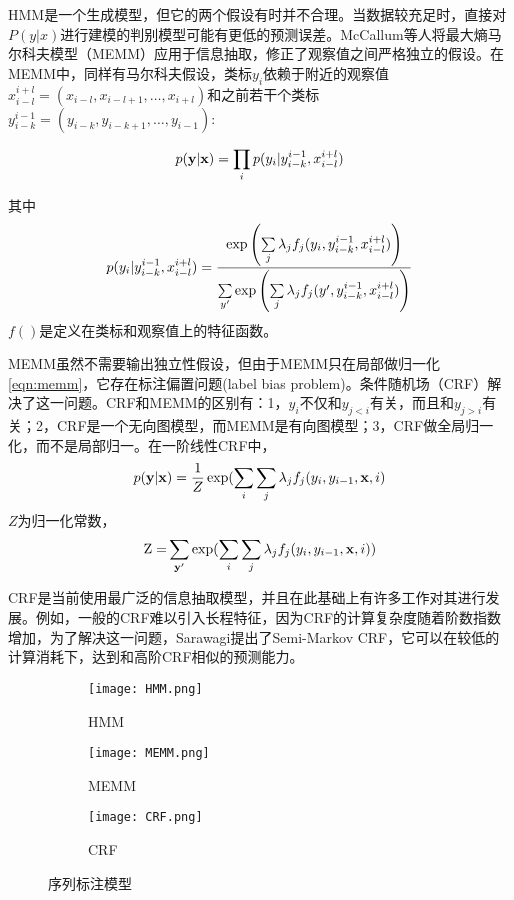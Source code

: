 HMM是一个生成模型，但它的两个假设有时并不合理。当数据较充足时，直接对$P(y|x)$进行建模的判别模型可能有更低的预测误差。McCallum等人将最大熵马尔科夫模型（MEMM）应用于信息抽取\cite{mccallum2000maximum}，修正了观察值之间严格独立的假设。在MEMM中，同样有马尔科夫假设，类标$y_i$依赖于附近的观察值$x_{i - l}^{i + l} = ({x_{i - l}},{x_{i - l + 1}}, \ldots ,{x_{i + l}})$和之前若干个类标$y_{i - k}^{i - 1} = ({y_{i - k}},{y_{i - k + 1}}, \ldots ,{y_{i - 1}})$:

\[p({\bf{y}}|{\bf{x}}) = \prod\limits_i {p({y_i}|y_{i - k}^{i - 1},x_{i - l}^{i + l})} \]

其中
\begin{equation}
{p({y_i}|y_{i - k}^{i - 1},x_{i - l}^{i + l})} = \frac{{\exp \left( {\sum\limits_j {{\lambda _j}{f_j}({y_i}} ,y_{i - k}^{i - 1},x_{i - l}^{i{\rm{ + }}l})} \right)}}{{\sum\limits_{y'} {\exp \left( {\sum\limits_j {{\lambda _j}{f_j}(y'} ,y_{i - k}^{i - 1},x_{i - l}^{i{\rm{ + }}l})} \right)} }} 
\label{eqn:memm}
\end{equation}
$f()$是定义在类标和观察值上的特征函数。

MEMM虽然不需要输出独立性假设，但由于MEMM只在局部做归一化\ref{eqn:memm}，它存在标注偏置问题(label bias problem)。条件随机场（CRF）\cite{lafferty2001conditional}解决了这一问题。CRF和MEMM的区别有：1，$y_i$不仅和$y_{j<i}$有关，而且和$y_{j>i}$有关；2，CRF是一个无向图模型，而MEMM是有向图模型；3，CRF做全局归一化，而不是局部归一。在一阶线性CRF中，
\[ p({\bf{y}}|{\bf{x}}) = \frac{1}{Z}\exp (\sum\limits_i {\sum\limits_j {{\lambda _j}{f_j}({y_i},{y_{i - 1}},{\bf{x}},i)} } \]
$Z$为归一化常数，	
\[{\rm{Z = }}\sum\limits_{{\bf{y'}}} {\exp (\sum\limits_i {\sum\limits_j {{\lambda _j}{f_j}({y_i},{y_{i - 1}},{\bf{x}},i)} } }) \]

CRF是当前使用最广泛的信息抽取模型，并且在此基础上有许多工作对其进行发展。例如，一般的CRF难以引入长程特征，因为CRF的计算复杂度随着阶数指数增加，为了解决这一问题，Sarawagi\cite{sarawagi2004semi}提出了Semi-Markov CRF，它可以在较低的计算消耗下，达到和高阶CRF相似的预测能力。

\begin{figure}[h]
\centering
\begin{subfigure}{0.3\textwidth}
\texttt{[image: HMM.png]}
\caption{HMM}
\end{subfigure}
\hspace{1em}
\begin{subfigure}{0.3\textwidth}
\texttt{[image: MEMM.png]}
\caption{MEMM}
\end{subfigure}
\hspace{1em}
\begin{subfigure}{0.3\textwidth}
\texttt{[image: CRF.png]}
\caption{CRF}
\end{subfigure}

\caption{序列标注模型}
\label{fig:seq_label_model}
\end{figure}

